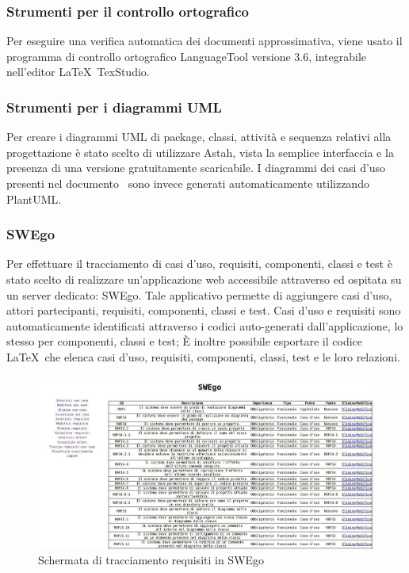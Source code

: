 \documentclass[../NormeDiProgetto.tex]{subfiles}
\begin{document}
			\subsubsection{Strumenti per il controllo ortografico}
				Per eseguire una verifica automatica dei documenti approssimativa,
				viene usato il programma di controllo ortografico LanguageTool versione 3.6, integrabile
				nell'editor \LaTeX\ TexStudio.
			\subsubsection{Strumenti per i diagrammi UML}	
				Per creare i diagrammi UML di package, classi, attività e sequenza relativi alla progettazione
				è stato scelto di utilizzare Astah, vista la semplice interfaccia e la presenza di una versione
				gratuitamente scaricabile.
				I diagrammi dei casi d'uso presenti nel documento \analisideirequisitiv\ sono invece generati
				automaticamente utilizzando PlantUML.
			\subsubsection{SWEgo}
				Per effettuare il tracciamento di casi d'uso, requisiti, componenti, classi e test è stato
				scelto di realizzare un'applicazione web accessibile attraverso  ed ospitata
				su un server dedicato: SWEgo.
				Tale applicativo permette di aggiungere casi d'uso, attori partecipanti, requisiti, componenti,
				classi e test.
				Casi d'uso e requisiti sono automaticamente identificati attraverso i codici auto-generati
				dall'applicazione, lo stesso per componenti, classi e test;
				È inoltre possibile esportare il codice \LaTeX\ che elenca casi d'uso,
				requisiti, componenti, classi, test e le loro relazioni.
				\begin{figure} [h!]
					\centering
					\includegraphics[scale=0.42]{./Immagini/SWEgo.jpg}
					\caption{Schermata di tracciamento requisiti in SWEgo}\label{}
				\end{figure}
\end{document}
